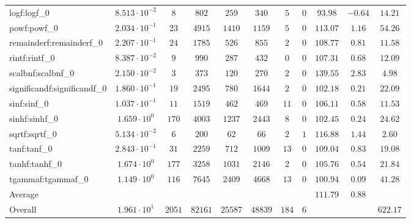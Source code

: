 \begin{tabular}{|l|c|c|c|c|c|c|c|c|c|c|}
logf:logf\_0                 & $ 8.513 \cdot 10^{-2} $ & $ 8      $ & $ 802   $ & $ 259   $ & $ 340   $ & $ 5   $ & $ 0 $ & $ 93.98       $ & $ -0.64   $ & $ 14.21   $ \\
powf:powf\_0                 & $ 2.034 \cdot 10^{-1} $ & $ 23     $ & $ 4915  $ & $ 1410  $ & $ 1159  $ & $ 5   $ & $ 0 $ & $ 113.07      $ & $ 1.16    $ & $ 54.26   $ \\
remainderf:remainderf\_0     & $ 2.207 \cdot 10^{-1} $ & $ 24     $ & $ 1785  $ & $ 526   $ & $ 855   $ & $ 2   $ & $ 0 $ & $ 108.77      $ & $ 0.81    $ & $ 11.58   $ \\
rintf:rintf\_0               & $ 8.387 \cdot 10^{-2} $ & $ 9      $ & $ 990   $ & $ 287   $ & $ 432   $ & $ 0   $ & $ 0 $ & $ 107.31      $ & $ 0.68    $ & $ 12.09   $ \\
scalbnf:scalbnf\_0           & $ 2.150 \cdot 10^{-2} $ & $ 3      $ & $ 373   $ & $ 120   $ & $ 270   $ & $ 2   $ & $ 0 $ & $ 139.55      $ & $ 2.83    $ & $ 4.98    $ \\
significandf:significandf\_0 & $ 1.860 \cdot 10^{-1} $ & $ 19     $ & $ 2495  $ & $ 780   $ & $ 1644  $ & $ 2   $ & $ 0 $ & $ 102.18      $ & $ 0.21    $ & $ 22.09   $ \\
sinf:sinf\_0                 & $ 1.037 \cdot 10^{-1} $ & $ 11     $ & $ 1519  $ & $ 462   $ & $ 469   $ & $ 11  $ & $ 0 $ & $ 106.11      $ & $ 0.58    $ & $ 11.53   $ \\
sinhf:sinhf\_0               & $ 1.659 \cdot 10^{0}  $ & $ 170    $ & $ 4003  $ & $ 1237  $ & $ 2443  $ & $ 8   $ & $ 0 $ & $ 102.45      $ & $ 0.24    $ & $ 24.62   $ \\
sqrtf:sqrtf\_0               & $ 5.134 \cdot 10^{-2} $ & $ 6      $ & $ 200   $ & $ 62    $ & $ 66    $ & $ 2   $ & $ 1 $ & $ 116.88      $ & $ 1.44    $ & $ 2.60    $ \\
tanf:tanf\_0                 & $ 2.843 \cdot 10^{-1} $ & $ 31     $ & $ 2259  $ & $ 712   $ & $ 1009  $ & $ 13  $ & $ 0 $ & $ 109.04      $ & $ 0.83    $ & $ 19.08   $ \\
tanhf:tanhf\_0               & $ 1.674 \cdot 10^{0}  $ & $ 177    $ & $ 3258  $ & $ 1031  $ & $ 2146  $ & $ 2   $ & $ 0 $ & $ 105.76      $ & $ 0.54    $ & $ 21.84   $ \\
tgammaf:tgammaf\_0           & $ 1.149 \cdot 10^{0}  $ & $ 116    $ & $ 7645  $ & $ 2409  $ & $ 4668  $ & $ 13  $ & $ 0 $ & $ 100.94      $ & $ 0.09    $ & $ 41.28   $ \\
\hline
Average                      & $                     $ & $        $ & $       $ & $       $ & $       $ & $     $ & $   $ & $ 111.79      $ & $ 0.88    $ & $         $ \\
\hline
Overall                      & $ 1.961 \cdot 10^{1}  $ & $ 2051   $ & $ 82161 $ & $ 25587 $ & $ 48839 $ & $ 184 $ & $ 6 $ & $             $ & $         $ & $ 622.17  $ \\
\hline
\end{tabular}
